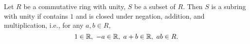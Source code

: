\begin{proposition}
  Let $R$ be a commutative ring with unity, $S$ be a subset of $R$.
  Then $S$ is a subring with unity if contains $1$ and is closed under
  negation, addition, and multiplication, i.e.,
  for any $a, b \in R$,
  \begin{equation}
    1 \in \mathbb{R},\ -a \in \mathbb{R},\ a + b \in \mathbb{R},\ a b \in R.
  \end{equation}
\end{proposition}
